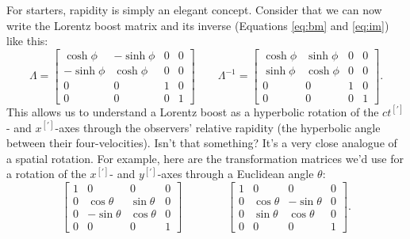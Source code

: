\documentclass[12pt]{article}
\begin{document}
For starters, rapidity is simply an elegant concept. Consider that we can now write the Lorentz boost matrix and its inverse (Equations \ref{eq:bm} and \ref{eq:im}) like this:
\begin{equation*}
\Lambda =
\begin{bmatrix}
\cosh{\phi} & -\sinh{\phi} & 0 & 0 \\
- \sinh{\phi} & \cosh{\phi} & 0 & 0 \\
0 & 0 & 1 & 0 \\
0 & 0 & 0 & 1
\end{bmatrix}
\qquad
\Lambda^{-1} =
\begin{bmatrix}
\cosh{\phi} & \sinh{\phi} & 0 & 0 \\
\sinh{\phi} & \cosh{\phi} & 0 & 0 \\
0 & 0 & 1 & 0 \\
0 & 0 & 0 & 1
\end{bmatrix} .
\end{equation*}
This allows us to understand a Lorentz boost as a hyperbolic rotation of the $ct^{[\prime]}$- and $x^{[\prime]}$-axes through the observers' relative rapidity (the hyperbolic angle between their four-velocities). Isn't that something? It's a very close analogue of a spatial rotation. For example, here are the transformation matrices we'd use for a rotation of the $x^{[\prime]}$- and $y^{[\prime]}$-axes through a Euclidean angle $\theta$:
\begin{equation*}
\begin{bmatrix}
1 & 0 & 0 & 0 \\
0 & \cos{\theta} & \sin{\theta} & 0 \\
0 & - \sin{\theta} & \cos{\theta} & 0 \\
0 & 0 & 0 & 1
\end{bmatrix}
\qquad \qquad
\begin{bmatrix}
1 & 0 & 0 & 0 \\
0 & \cos{\theta} & -\sin{\theta} & 0 \\
0 & \sin{\theta} & \cos{\theta} & 0 \\
0 & 0 & 0 & 1
\end{bmatrix} .
\end{equation*}
\end{document}
